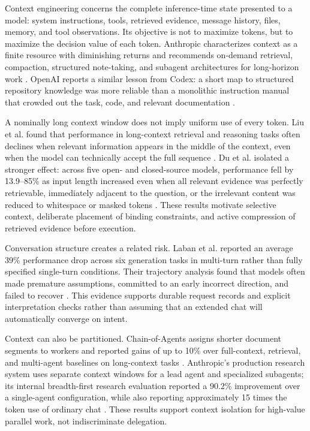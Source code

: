 \documentclass[11pt,a4paper]{article}
\begin{document}
Context engineering concerns the complete inference-time state presented to a model: system instructions, tools, retrieved evidence, message history, files, memory, and tool observations. Its objective is not to maximize tokens, but to maximize the decision value of each token. Anthropic characterizes context as a finite resource with diminishing returns and recommends on-demand retrieval, compaction, structured note-taking, and subagent architectures for long-horizon work \cite{anthropiccontext2025}. OpenAI reports a similar lesson from Codex: a short map to structured repository knowledge was more reliable than a monolithic instruction manual that crowded out the task, code, and relevant documentation \cite{openaiharness2026}.

A nominally long context window does not imply uniform use of every token. Liu et al. found that performance in long-context retrieval and reasoning tasks often declines when relevant information appears in the middle of the context, even when the model can technically accept the full sequence \cite{liu2024}. Du et al. isolated a stronger effect: across five open- and closed-source models, performance fell by 13.9--85\% as input length increased even when all relevant evidence was perfectly retrievable, immediately adjacent to the question, or the irrelevant content was reduced to whitespace or masked tokens \cite{du2025context}. These results motivate selective context, deliberate placement of binding constraints, and active compression of retrieved evidence before execution.

Conversation structure creates a related risk. Laban et al. reported an average 39\% performance drop across six generation tasks in multi-turn rather than fully specified single-turn conditions. Their trajectory analysis found that models often made premature assumptions, committed to an early incorrect direction, and failed to recover \cite{laban2025multiturn}. This evidence supports durable request records and explicit interpretation checks rather than assuming that an extended chat will automatically converge on intent.

Context can also be partitioned. Chain-of-Agents assigns shorter document segments to workers and reported gains of up to 10\% over full-context, retrieval, and multi-agent baselines on long-context tasks \cite{zhang2024chainagents}. Anthropic's production research system uses separate context windows for a lead agent and specialized subagents; its internal breadth-first research evaluation reported a 90.2\% improvement over a single-agent configuration, while also reporting approximately 15 times the token use of ordinary chat \cite{anthropicmultiagent2025}. These results support context isolation for high-value parallel work, not indiscriminate delegation.
\end{document}
